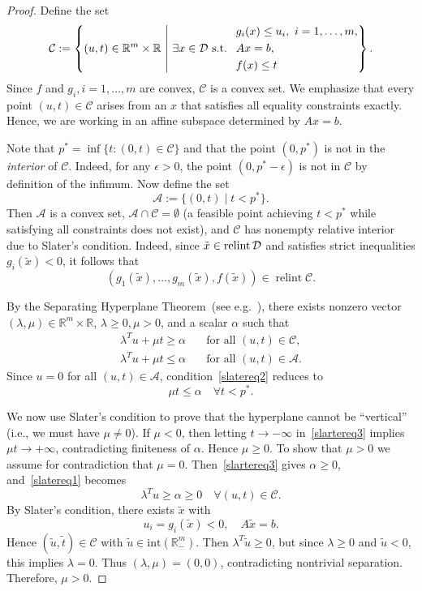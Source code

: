 \begin{proof}
Define the set
$$
\mathcal{C}
:= \left\{ (u,t) \in \mathbb{R}^m \times \mathbb{R}\,\, \middle| 
\,\,\exists x \in {\mathcal D} \text{ s.t. }\,\,
\begin{aligned}
& g_i(x) \le u_i,\ i=1,\dots,m, \\
& Ax=b, \\
& f(x) \le t
\end{aligned}
\right\}.
$$
Since $f$ and $g_i, i=1,\dots,m$ are convex, $\mathcal{C}$ is a convex set.
We emphasize that every point $(u,t) \in \mathcal{C}$
arises from an $x$ that satisfies all equality constraints exactly. Hence, we are working in an affine subspace determined by $Ax=b$.

Note that
$p^* = \inf \{ t: (0,t) \in \mathcal{C} \}$ and that
the point $(0,p^*)$ is not in the {\em interior} of $\mathcal C$. Indeed, for any $\epsilon > 0$, the point $(0, p^* - \epsilon)$ is not in $\mathcal{C}$ by definition of the infimum.
Now define the set
$$
\mathcal{A} := \{ (0,t) \mid t < p^* \}.
$$
Then $\mathcal{A}$ is a convex set, $\mathcal{A} \cap \mathcal{C} = \emptyset$ (a feasible point achieving $t < p^*$ while satisfying all constraints does not exist), and $\mathcal{C}$ has nonempty relative interior due to Slater’s condition.
Indeed, since $\tilde{x} \in \operatorname{relint} {\mathcal D}$ and satisfies strict inequalities $g_i(\tilde{x}) < 0$, it follows that
$$
(g_1(\tilde{x}),\dots,g_m(\tilde{x}),f(\tilde{x})) \in \operatorname{relint} \mathcal{C}.
$$

By the Separating Hyperplane Theorem~(see e.g.~\cite[Chapter 2]{LVanderberghe_SBoyd_book}), there exists nonzero vector $(\lambda,\mu) \in \mathbb{R}^m \times \mathbb{R}$,
$\lambda \ge 0, \mu > 0$,
and a scalar $\alpha$ such that
\begin{align}    
\lambda^T u + \mu t \ge \alpha
\quad & \text{for all } (u,t) \in \mathcal{C},  \label{slatereq1}
\\
\lambda^T u + \mu t \le \alpha
\quad & \text{for all } (u,t) \in \mathcal{A}.\label{slatereq2}
\end{align}
Since $u = 0$ for all $(u,t) \in \mathcal{A}$,
 condition~\eqref{slatereq2} reduces to
\begin{equation}
\label{slartereq3}
\mu t \le \alpha \quad \forall t < p^*.
\end{equation}

We now use Slater’s condition  to prove that the hyperplane cannot be ``vertical'' (i.e., we must have $\mu \neq 0$).
If $\mu < 0$, then letting $t\to -\infty$ in~\eqref{slartereq3} implies $\mu t \to +\infty$, contradicting finiteness of $\alpha$. Hence $\mu \ge 0$. To show that $\mu >0$ we assume for
 contradiction that $\mu=0$. Then~\eqref{slartereq3} gives $\alpha \ge 0$, and~\eqref{slatereq1} becomes
$$
\lambda^T u \ge \alpha \ge 0
\quad \forall (u,t)\in\mathcal C.
$$
By Slater’s condition, there exists $\tilde{x}$ with
$$
u_i = g_i(\tilde x) < 0,\quad A\tilde x=b.
$$
Hence $(\tilde u,\tilde t)\in\mathcal C $ with $\tilde u \in \mathrm{int}(\mathbb{R}^m_-)$. Then $\lambda^T \tilde u \ge 0$,
but since $\lambda \ge 0$ and $\tilde u < 0$, this implies
$\lambda = 0$.
Thus $(\lambda,\mu)=(0,0)$, contradicting nontrivial separation.
Therefore, $\mu > 0$.


\end{proof}

